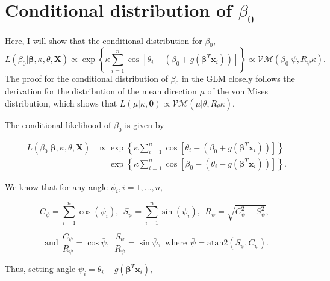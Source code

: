 \documentclass[12pt,a4paper]{article}\usepackage[]{graphicx}\usepackage[]{color}
\begin{document}
\appendix

\section{Conditional distribution of $\beta_0$} \label{beta0}

Here, I will show that the conditional distribution for $\beta_0$,
$$ L(\beta_0 \vert \boldsymbol\beta, \kappa, \theta, \boldsymbol{X}) \propto \exp \left\lbrace \kappa \sum_{i=1}^n \cos \left[ \theta_i - (\beta_0 + g(\boldsymbol\beta^T \boldsymbol{x}_i)) \right]  \right\rbrace \propto \mathcal{VM}(\beta_0 \vert \bar\psi, R_{\psi}\kappa). $$
The proof for the conditional distribution of $\beta_0$ in the GLM closely follows the derivation for the distribution of the mean direction $\mu$ of the von Mises distribution, which shows that $L(\mu \vert \kappa, \boldsymbol\theta) \propto \mathcal{VM}(\mu \vert \bar\theta, R_{\theta} \kappa)$.

The conditional likelihood of $\beta_0$ is given by

\begin{align*}
L(\beta_0 \vert \boldsymbol\beta, \kappa, \theta, \boldsymbol{X}) & \propto \exp \left\lbrace \kappa \sum_{i=1}^n \cos \left[ \theta_i - (\beta_0 + g(\boldsymbol\beta^T \boldsymbol{x}_i)) \right] \right\rbrace \\
& = \exp \left\lbrace \kappa \sum_{i=1}^n \cos \left[ \beta_0 - (\theta_i - g(\boldsymbol\beta^T \boldsymbol{x}_i)) \right]  \right\rbrace.
\end{align*}

We know that for any angle $\psi_i, i = 1, \dots, n$,

$$ C_{\psi} = \sum_{i=1}^n \cos(\psi_i), ~~ S_{\psi} = \sum_{i=1}^n \sin(\psi_i), ~~ R_{\psi} = \sqrt{C_{\psi}^2 + S_{\psi}^2}, ~~ $$

$$ \text{and} ~~ \frac{C_{\psi}}{R_{\psi}} = \cos \bar\psi, ~~ \frac{S_{\psi}}{R_{\psi}} = \sin \bar\psi, ~~ \text{where} ~~ \bar\psi = \text{atan2}(S_{\psi}, C_{\psi}). $$

Thus, setting angle $\psi_i = \theta_i - g(\boldsymbol\beta^T \boldsymbol{x}_i)$,
\end{document}
